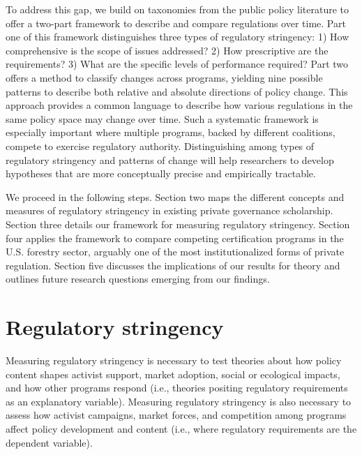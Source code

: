 \documentclass[
      12pt,
            Review ]{article}
\begin{document}
To address this gap, we build on taxonomies from the public policy
literature to offer a two-part framework to describe and compare
regulations over time. Part one of this framework distinguishes three
types of regulatory stringency: 1) How comprehensive is the scope of
issues addressed? 2) How prescriptive are the requirements? 3) What are
the specific levels of performance required? Part two offers a method to
classify changes across programs, yielding nine possible patterns to
describe both relative and absolute directions of policy change. This
approach provides a common language to describe how various regulations
in the same policy space may change over time. Such a systematic
framework is especially important where multiple programs, backed by
different coalitions, compete to exercise regulatory authority.
Distinguishing among types of regulatory stringency and patterns of
change will help researchers to develop hypotheses that are more
conceptually precise and empirically tractable.

We proceed in the following steps. Section two maps the different
concepts and measures of regulatory stringency in existing private
governance scholarship. Section three details our framework for
measuring regulatory stringency. Section four applies the framework to
compare competing certification programs in the U.S. forestry sector,
arguably one of the most institutionalized forms of private regulation.
Section five discusses the implications of our results for theory and
outlines future research questions emerging from our findings.

\section{Regulatory stringency}\label{regulatory-stringency}

Measuring regulatory stringency is necessary to test theories about how
policy content shapes activist support, market adoption, social or
ecological impacts, and how other programs respond (i.e., theories
positing regulatory requirements as an explanatory variable). Measuring
regulatory stringency is also necessary to assess how activist
campaigns, market forces, and competition among programs affect policy
development and content (i.e., where regulatory requirements are the
dependent variable).
\end{document}
